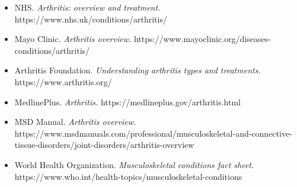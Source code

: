 \begin{itemize}
    \item NHS. \textit{Arthritis: overview and treatment.} https://www.nhs.uk/conditions/arthritis/
    \item Mayo Clinic. \textit{Arthritis overview.} https://www.mayoclinic.org/diseases-conditions/arthritis/
    \item Arthritis Foundation. \textit{Understanding arthritis types and treatments.} https://www.arthritis.org/
    \item MedlinePlus. \textit{Arthritis.} https://medlineplus.gov/arthritis.html
    \item MSD Manual. \textit{Arthritis overview.} https://www.msdmanuals.com/professional/musculoskeletal-and-connective-tissue-disorders/joint-disorders/arthritis-overview
    \item World Health Organization. \textit{Musculoskeletal conditions fact sheet.} https://www.who.int/health-topics/musculoskeletal-conditions
\end{itemize}
